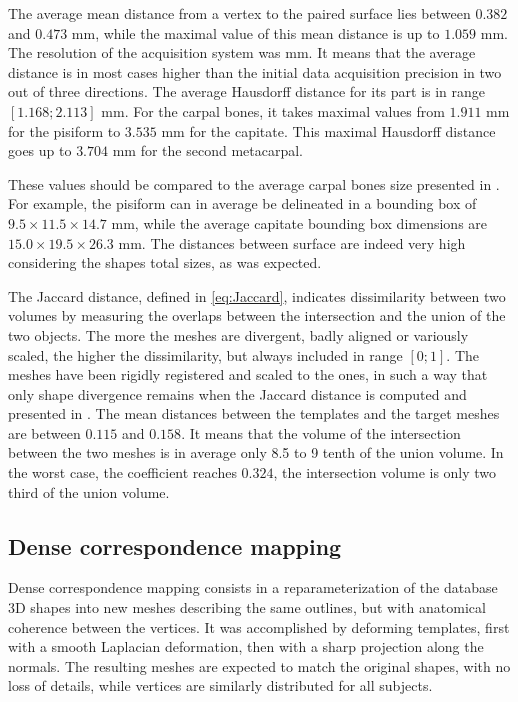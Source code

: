 The average mean distance from a vertex to the paired surface lies between $0.382$ and $0.473$ mm, while the maximal value of this mean distance is up to $1.059$ mm. The resolution of the acquisition system was \precision* mm. It means that the average distance is in most cases higher than the initial data acquisition precision in two out of three directions. The average Hausdorff distance for its part is in range $[1.168; 2.113]$ mm. For the carpal bones, it takes maximal values from $1.911$ mm for the pisiform to $3.535$ mm for the capitate. This maximal Hausdorff distance goes up to $3.704$ mm for the second metacarpal. 

These values should be compared to the average carpal bones size presented in . For example, the pisiform can in average be delineated in a bounding box of $9.5 \times 11.5 \times 14.7$ mm, while the average capitate bounding box dimensions are $15.0 \times 19.5 \times 26.3$ mm. The distances between surface are indeed very high considering the shapes total sizes, as was expected. 


The Jaccard distance, defined in \eqref{eq:Jaccard}, indicates dissimilarity between two volumes by measuring the overlaps between the intersection and the union of the two objects. The more the meshes are divergent, badly aligned or variously scaled, the higher the dissimilarity, but always included in range $[0;1]$. The \mr* meshes have been rigidly registered and scaled to the \mt* ones, in such a way that only shape divergence remains when the Jaccard distance is computed and presented in . The mean distances between the templates and the target meshes are between $0.115$ and $0.158$. It means that the volume of the intersection between the two meshes is in average only 8.5 to 9 tenth of the union volume. In the worst case, the coefficient reaches $0.324$, the intersection volume is only two third of the union volume. 



\subsection{Dense correspondence mapping}

Dense correspondence mapping consists in a reparameterization of the database 3D shapes into new meshes describing the same outlines, but with anatomical coherence between the vertices. It was accomplished by deforming templates, first with a smooth Laplacian deformation, then with a sharp projection along the normals. The resulting meshes are expected to match the original shapes, with no loss of details, while vertices are similarly distributed for all subjects. 

